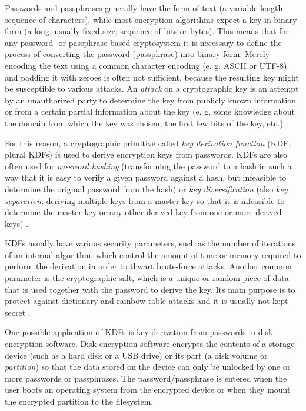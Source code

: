 \documentclass[12pt,oneside]{fithesis2}
\begin{document}
      Passwords and passphrases generally have the form of text (a variable-length sequence of characters), while most encryption algorithms expect a key in binary form (a long, usually fixed-size, sequence of bits or bytes). This means that for any password- or pass\-phrase-based cryptosystem it is necessary to define the process of converting the password (passphrase) into binary form. Merely encoding the text using a common character encoding (e. g. ASCII or UTF-8) and padding it with zeroes is often not sufficient, because the resulting key might be susceptible to various attacks. An \emph{attack} on a cryptographic key is an attempt by an unauthorized party to determine the key from publicly known information or from a certain partial information about the key (e. g. some knowledge about the domain from which the key was chosen, the first few bits of the key, etc.). %
    
      For this reason, a cryptographic primitive called \emph{key derivation function} (KDF, plural KDFs) is used to derive encryption keys from passwords. KDFs are also often used for \emph{password hashing} (transforming the password to a hash in such a way that it is easy to verify a given password against a hash, but infeasible to determine the original password from the hash) or \emph{key diversification} (also \emph{key separation}; deriving multiple keys from a master key so that it is infeasible to determine the master key or any other derived key from one or more derived keys) \cite{wikiKDF, nist:sp800:108}.
    
      KDFs usually have various security parameters, such as the number of iterations of an internal algorithm, which control the amount of time or memory required to perform the derivation in order to thwart brute-force attacks. Another common parameter is the cryptographic salt, which is a unique or random piece of data that is used together with the password to derive the key. Its main purpose is to protect against dictionary and rainbow table attacks and it is usually not kept secret \cite{rfc2898}.
      
      \sloppy
      One possible application of KDFs is key derivation from passwords in disk encryption software. Disk encryption software encrypts the contents of a storage device (such as a hard disk or a USB drive) or its part (a disk volume or \emph{partition}) so that the data stored on the device can only be unlocked by one or more passwords or passphrases. The password/passphrase is entered when the user boots an operating system from the encrypted device or when they mount the encrypted partition to the filesystem.
      
\end{document}
